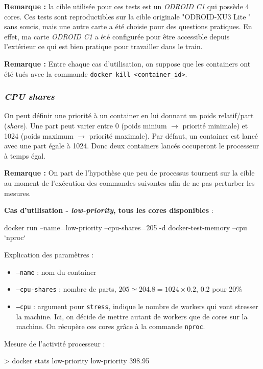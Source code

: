 \documentclass[11pt,a4paper,oneside]{report}
\newcommand{\code}[1]{\texttt{#1}}
\newcommand{\odroid}{ODROID-XU3 Lite }
\begin{document}
\textbf{Remarque :} la cible utilisée pour ces tests est un \textit{ODROID C1} qui possède 4 cores. Ces tests sont reproductibles sur la cible originale "\odroid" sans soucis, mais une autre carte a été choisie pour des questions pratiques. En effet, ma carte \textit{ODROID C1} a été configurée pour être accessible depuis l'extérieur ce qui est bien pratique pour travailler dans le train.

\textbf{Remarque :} Entre chaque cas d'utilisation, on suppose que les containers ont été tués avec la commande \code{docker kill <container\_id>}.


\subsubsection{\textit{CPU shares}}
On peut définir une priorité à un container en lui donnant un poids relatif/part (\textit{share}). Une part peut varier entre 0 (poids minium $\to$ priorité minimale) et 1024 (poids maximum $\to$ priorité maximale). Par défaut, un container est lancé avec une part égale à 1024. Donc deux containers lancés occuperont le processeur à temps égal.


\textbf{Remarque :} On part de l'hypothèse que peu de processus tournent sur la cible au moment de l'exécution des commandes suivantes afin de ne pas perturber les mesures.

\textbf{Cas d'utilisation - \textit{low-priority}, tous les cores disponibles} : 
\begin{textcode}
docker run --name=low-priority --cpu-shares=205 -d docker-test-memory --cpu `nproc`
\end{textcode}

Explication des paramètres :
\begin{itemize}
\item \code{--name} : nom du container
\item \code{--cpu-shares} : nombre de parts, $205 \simeq 204.8 = 1024 \times 0.2$, 0.2 pour 20\%
\item \code{--cpu} : argument pour \code{stress}, indique le nombre de workers qui vont stresser la machine. Ici, on décide de mettre autant de workers que de cores sur la machine. On récupère ces cores grâce à la commande \code{nproc}.
\end{itemize}

Mesure de l'activité processeur :
\begin{bashcode}
> docker stats low-priority
low-priority   398.95%
\end{bashcode}
\end{document}
